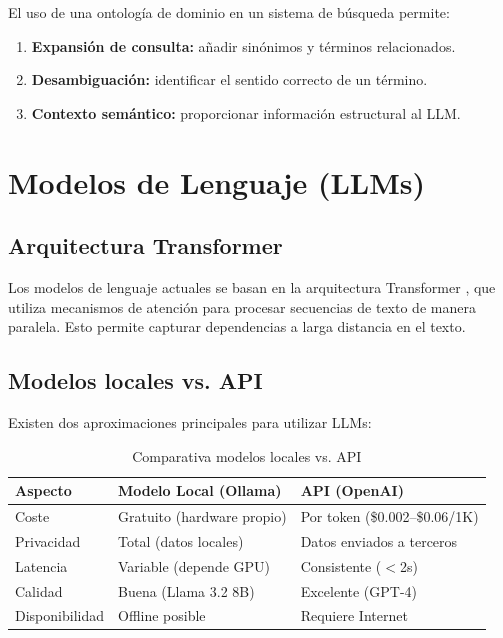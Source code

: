 \documentclass[12pt, a4paper, twoside]{report}
\begin{document}
El uso de una ontolog\'ia de dominio en un sistema de b\'usqueda permite:

\begin{enumerate}
  \item \textbf{Expansi\'on de consulta:} a\~nadir sin\'onimos y t\'erminos relacionados.
  \item \textbf{Desambiguaci\'on:} identificar el sentido correcto de un t\'ermino.
  \item \textbf{Contexto sem\'antico:} proporcionar informaci\'on estructural al LLM.
\end{enumerate}

\section{Modelos de Lenguaje (LLMs)}

\subsection{Arquitectura Transformer}

Los modelos de lenguaje actuales se basan en la arquitectura Transformer \cite{vaswani2017}, que utiliza mecanismos de atenci\'on para procesar secuencias de texto de manera paralela. Esto permite capturar dependencias a larga distancia en el texto.

\subsection{Modelos locales vs. API}

Existen dos aproximaciones principales para utilizar LLMs:

\begin{table}[H]
\centering
\caption{Comparativa modelos locales vs. API}
\label{tab:llm-comparativa}
\begin{tabularx}{\textwidth}{lXX}
\toprule
\textbf{Aspecto} & \textbf{Modelo Local (Ollama)} & \textbf{API (OpenAI)} \\
\midrule
Coste & Gratuito (hardware propio) & Por token (\$0.002--\$0.06/1K) \\
Privacidad & Total (datos locales) & Datos enviados a terceros \\
Latencia & Variable (depende GPU) & Consistente ($<$2s) \\
Calidad & Buena (Llama 3.2 8B) & Excelente (GPT-4) \\
Disponibilidad & Offline posible & Requiere Internet \\
\bottomrule
\end{tabularx}
\end{table}
\end{document}
